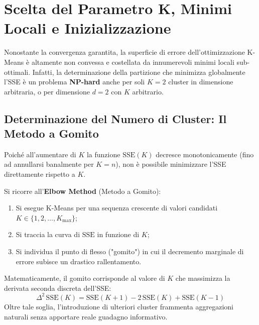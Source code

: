 \FloatBarrier
\section{Scelta del Parametro K, Minimi Locali e Inizializzazione}
\label{sec:dm-kmeans-k-choice-local-minima}

Nonostante la convergenza garantita, la superficie di errore dell'ottimizzazione K-Means è altamente non convessa e costellata da innumerevoli minimi locali sub-ottimali. Infatti, la determinazione della partizione che minimizza globalmente l'SSE è un problema \textbf{NP-hard} anche per soli $K = 2$ cluster in dimensione arbitraria, o per dimensione $d = 2$ con $K$ arbitrario.

\FloatBarrier
\subsection{Determinazione del Numero di Cluster: Il Metodo a Gomito}
\label{sec:dm-kmeans-elbow-method}

Poiché all'aumentare di $K$ la funzione $\mathrm{SSE}(K)$ decresce monotonicamente (fino ad annullarsi banalmente per $K = n$), non è possibile minimizzare l'SSE direttamente rispetto a $K$. 

Si ricorre all'\textbf{Elbow Method} (Metodo a Gomito):
\begin{enumerate}
    \item Si esegue K-Means per una sequenza crescente di valori candidati $K \in \{1, 2, \dots, K_{\max}\}$;
    \item Si traccia la curva di $\mathrm{SSE}$ in funzione di $K$;
    \item Si individua il punto di flesso ("gomito") in cui il decremento marginale di errore subisce un drastico rallentamento.
\end{enumerate}
Matematicamente, il gomito corrisponde al valore di $K$ che massimizza la derivata seconda discreta dell'SSE:
\begin{equation}
    \Delta^2 \, \mathrm{SSE}(K) = \mathrm{SSE}(K+1) - 2 \, \mathrm{SSE}(K) + \mathrm{SSE}(K-1)
\end{equation}
Oltre tale soglia, l'introduzione di ulteriori cluster frammenta aggregazioni naturali senza apportare reale guadagno informativo.

\FloatBarrier

